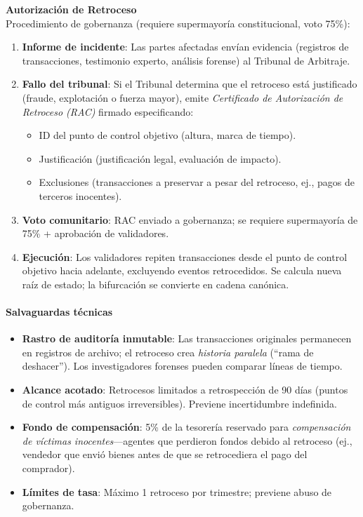 \documentclass[11pt]{article}
\begin{document}
\textbf{Autorización de Retroceso}\\
Procedimiento de gobernanza (requiere supermayoría constitucional, voto 75\%):
\begin{enumerate}[noitemsep]
  \item \textbf{Informe de incidente}: Las partes afectadas envían evidencia (registros de transacciones, testimonio experto, análisis forense) al Tribunal de Arbitraje.
  \item \textbf{Fallo del tribunal}: Si el Tribunal determina que el retroceso está justificado (fraude, explotación o fuerza mayor), emite \emph{Certificado de Autorización de Retroceso (RAC)} firmado especificando:
    \begin{itemize}[noitemsep]
      \item ID del punto de control objetivo (altura, marca de tiempo).
      \item Justificación (justificación legal, evaluación de impacto).
      \item Exclusiones (transacciones a preservar a pesar del retroceso, ej., pagos de terceros inocentes).
    \end{itemize}
  \item \textbf{Voto comunitario}: RAC enviado a gobernanza; se requiere supermayoría de 75\% + aprobación de validadores.
  \item \textbf{Ejecución}: Los validadores repiten transacciones desde el punto de control objetivo hacia adelante, excluyendo eventos retrocedidos. Se calcula nueva raíz de estado; la bifurcación se convierte en cadena canónica.
\end{enumerate}

\paragraph{Salvaguardas técnicas}
\begin{itemize}[noitemsep]
  \item \textbf{Rastro de auditoría inmutable}: Las transacciones originales permanecen en registros de archivo; el retroceso crea \emph{historia paralela} (``rama de deshacer''). Los investigadores forenses pueden comparar líneas de tiempo.
  \item \textbf{Alcance acotado}: Retrocesos limitados a retrospección de 90 días (puntos de control más antiguos irreversibles). Previene incertidumbre indefinida.
  \item \textbf{Fondo de compensación}: 5\% de la tesorería reservado para \emph{compensación de víctimas inocentes}—agentes que perdieron fondos debido al retroceso (ej., vendedor que envió bienes antes de que se retrocediera el pago del comprador).
  \item \textbf{Límites de tasa}: Máximo 1 retroceso por trimestre; previene abuso de gobernanza.
\end{itemize}
\end{document}

